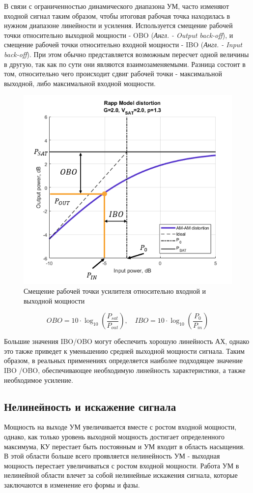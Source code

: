 В связи с ограниченностью динамического диапазона УМ, часто изменяют
входной сигнал таким образом, чтобы итоговая рабочая точка находилась в
нужном диапазоне линейности и усиления. Используется смещение рабочей точки
относительно выходной мощности - OBO (\textit{Англ. - Output back-off}), и
смещение рабочей точки относительно входной мощности - IBO (\textit{Англ. -
Input back-off}). При этом обычно представляется возможным пересчет одной
величины в другую, так как по сути они являются взаимозаменяемыми. Разница
состоит в том, относительно чего происходит сдвиг рабочей точки -
максимальной выходной, либо максимальной входной мощности.

\begin{figure}[h!]
    \centering
    \includegraphics[width=0.7\linewidth]{figs/pa_obo_ibo.png}
    \caption{Смещение рабочей точки усилителя относительно входной и выходной мощности}
    \label{fig:1.2}
\end{figure}

\begin{equation}
    OBO = 10 \cdot \log_{10}\left(\frac{P_{sat}}{P_{out}}\right), \quad
    IBO = 10 \cdot \log_{10}\left(\frac{P_{0}}{P_{in}}\right)
\end{equation}

Большие значения IBO\slash OBO могут обеспечить хорошую линейность АХ,
однако это также приведет к уменьшению средней выходной мощности сигнала.
Таким образом, в реальных применениях определяется наиболее подходящее
значение IBO \slash OBO, обеспечивающее необходимую линейность
характеристики, а также необходимое усиление.


\subsection{Нелинейность и искажение сигнала}
Мощность на выходе УМ увеличивается вместе с ростом входной мощности,
однако, как только уровень выходной мощность достигает определенного
максимума, КУ перестает быть постоянным и УМ входит в область насыщения. В
этой области больше всего проявляется нелинейность УМ - выходная мощность
перестает увеличиваться с ростом входной мощности. Работа УМ в нелинейной
области влечет за собой нелинейные искажения сигнала, которые заключаются в
изменение его формы и фазы.

